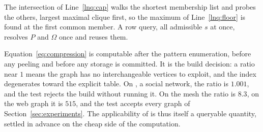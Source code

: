 The intersection of Line~\ref{lnq:cap} walks the shortest membership list and probes the others, largest maximal clique first, so the maximum of Line~\ref{lnq:floor} is found at the first common member.
%
A row query, all admissible $s$ at once, resolves $P$ and $\Omega$ once and reuses them.

Equation~\eqref{eq:compression} is computable after the pattern enumeration, before any peeling and before any storage is committed.
%
It is the build decision: a ratio near $1$ means the graph has no interchangeable vertices to exploit, and the index degenerates toward the explicit table.
%
On \pokec, a social network, the ratio is $1.001$, and the test rejects the build without running it.
%
On the mesh \nasasrb{} the ratio is $8.3$, on the web graph \webit{} it is $515$, and the test accepts every graph of Section~\ref{sec:experiments}.
%
The applicability of \nsi{} is thus itself a queryable quantity, settled in advance on the cheap side of the computation.
